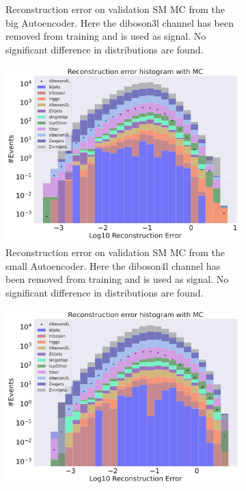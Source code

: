 \begin{figure}[H]
\begin{subfigure}{.45\textwidth}
        \caption{Reconstruction error on validation SM MC from the big Autoencoder. Here the diboson3l channel has been removed from training and 
        is used as signal. No significant difference in distributions are found. }
        \label{fig:vae_big_diboson3l}
    \end{subfigure}
    \hfill
    \begin{subfigure}{.45\textwidth}
        \includegraphics[width=\textwidth]{Figures/VAE_testing/small/b_data_recon_big_rm3_feats_sig_diboson4l.pdf}
        \caption{Reconstruction error on validation SM MC from the small Autoencoder. Here the diboson4l channel has been removed from training and 
        is used as signal. No significant difference in distributions are found. }
        \label{fig:vae_small_diboson4l}
    \end{subfigure}
    \hfill 
    \begin{subfigure}{.45\textwidth}
        \includegraphics[width=\textwidth]{Figures/VAE_testing/big/b_data_recon_big_rm3_feats_sig_diboson4l.pdf}

\end{subfigure}
\end{figure}
